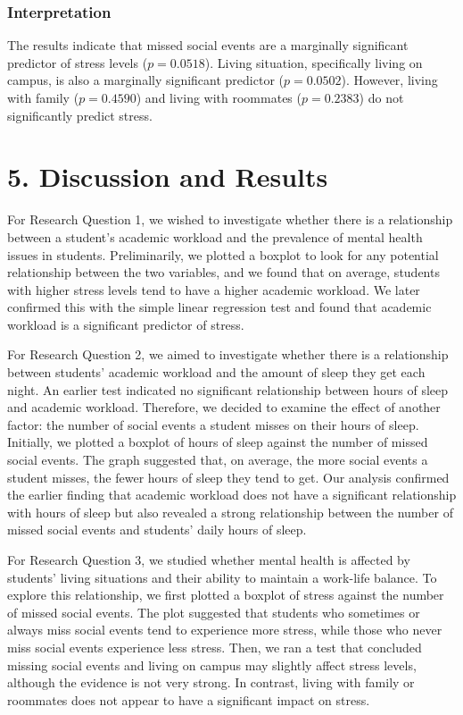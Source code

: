 \documentclass[
  letterpaper,
  DIV=11,
  numbers=noendperiod]{scrartcl}
\begin{document}
\subsubsection{Interpretation}\label{interpretation-2}

The results indicate that missed social events are a marginally
significant predictor of stress levels (\(p = 0.0518\)). Living
situation, specifically living on campus, is also a marginally
significant predictor (\(p = 0.0502\)). However, living with family
(\(p = 0.4590\)) and living with roommates (\(p = 0.2383\)) do not
significantly predict stress.

\section{5. Discussion and Results}\label{discussion-and-results}

For Research Question 1, we wished to investigate whether there is a
relationship between a student's academic workload and the prevalence of
mental health issues in students. Preliminarily, we plotted a boxplot to
look for any potential relationship between the two variables, and we
found that on average, students with higher stress levels tend to have a
higher academic workload. We later confirmed this with the simple linear
regression test and found that academic workload is a significant
predictor of stress.

For Research Question 2, we aimed to investigate whether there is a
relationship between students' academic workload and the amount of sleep
they get each night. An earlier test indicated no significant
relationship between hours of sleep and academic workload. Therefore, we
decided to examine the effect of another factor: the number of social
events a student misses on their hours of sleep. Initially, we plotted a
boxplot of hours of sleep against the number of missed social events.
The graph suggested that, on average, the more social events a student
misses, the fewer hours of sleep they tend to get. Our analysis
confirmed the earlier finding that academic workload does not have a
significant relationship with hours of sleep but also revealed a strong
relationship between the number of missed social events and students'
daily hours of sleep.

For Research Question 3, we studied whether mental health is affected by
students' living situations and their ability to maintain a work-life
balance. To explore this relationship, we first plotted a boxplot of
stress against the number of missed social events. The plot suggested
that students who sometimes or always miss social events tend to
experience more stress, while those who never miss social events
experience less stress. Then, we ran a test that concluded missing
social events and living on campus may slightly affect stress levels,
although the evidence is not very strong. In contrast, living with
family or roommates does not appear to have a significant impact on
stress.
\end{document}

